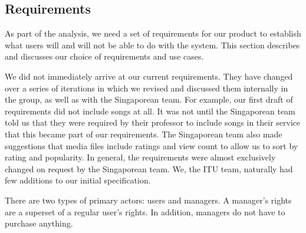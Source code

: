 \subsection{Requirements}
As part of the analysis, we need a set of requirements for our product to
establish what users will and will not be able to do with the system. This
section describes and discusses our choice of requirements and use cases.

We did not immediately arrive at our current requirements. They have changed
over a series of iterations in which we revised and discussed them internally in
the group, as well as with the Singaporean team. For example, our first draft of
requirements did not include songs at all. It was not until the Singaporean team
told us that they were required by their professor to include songs in their
service that this became part of our requirements. The Singaporean team also
made suggestions that media files include ratings and view count to allow us to
sort by rating and popularity. In general, the requirements were almost
exclusively changed on request by the Singaporean team. We, the ITU team,
naturally had few additions to our initial specification.

There are two types of primary actors: users and managers. A manager’s rights are a
superset of a regular user’s rights. In addition, managers do not have to
purchase anything.


